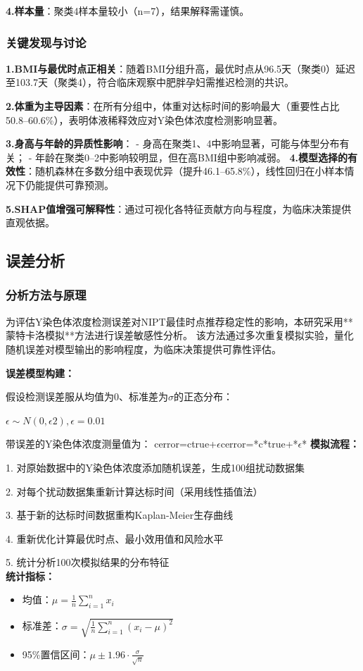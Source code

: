 \documentclass{article}
\begin{document}
\textbf{4.样本量}：聚类4样本量较小（n=7），结果解释需谨慎。
\subsubsection{\textbf{关键发现与讨论}}
\textbf{1.BMI与最优时点正相关}：随着BMI分组升高，最优时点从96.5天（聚类0）延迟至103.7天（聚类4），符合临床观察中肥胖孕妇需推迟检测的共识。

\textbf{2.体重为主导因素}：在所有分组中，体重对达标时间的影响最大（重要性占比50.8–60.6\%），表明体液稀释效应对Y染色体浓度检测影响显著。

\textbf{3.身高与年龄的异质性影响}：
- 身高在聚类1、4中影响显著，可能与体型分布有关；
- 年龄在聚类0–2中影响较明显，但在高BMI组中影响减弱。
\textbf{4.模型选择的有效性}：随机森林在多数分组中表现优异（提升46.1–65.8\%），线性回归在小样本情况下仍能提供可靠预测。

\textbf{5.SHAP值增强可解释性}：通过可视化各特征贡献方向与程度，为临床决策提供直观依据。
\subsection{\textbf{误差分析}}
\subsubsection{\textbf{分析方法与原理}}
为评估Y染色体浓度检测误差对NIPT最佳时点推荐稳定性的影响，本研究采用**蒙特卡洛模拟**方法进行误差敏感性分析。
该方法通过多次重复模拟实验，量化随机误差对模型输出的影响程度，为临床决策提供可靠性评估。

\textbf{误差模型构建：}

假设检测误差服从均值为0、标准差为$\sigma$的正态分布：

$\epsilon \sim N(0,\epsilon2),\epsilon=0.01$

带误差的Y染色体浓度测量值为：
cerror=ctrue+$\epsilon$cerror=*c*true+*$\epsilon$*
\textbf{模拟流程：}

1. 对原始数据中的Y染色体浓度添加随机误差，生成100组扰动数据集

2. 对每个扰动数据集重新计算达标时间（采用线性插值法）

3. 基于新的达标时间数据重构Kaplan-Meier生存曲线

4. 重新优化计算最优时点、最小效用值和风险水平

5. 统计分析100次模拟结果的分布特征\\
\textbf{统计指标：}
\begin{itemize}
    \item 均值：$\mu = \frac{1}{n}\sum_{i=1}^{n} x_i$
    \item 标准差：$\sigma = \sqrt{\frac{1}{n}\sum_{i=1}^{n} (x_i - \mu)^2}$
    \item 95\%置信区间：$\mu \pm 1.96 \cdot \frac{\sigma}{\sqrt{n}}$
\end{itemize}
\end{document}
